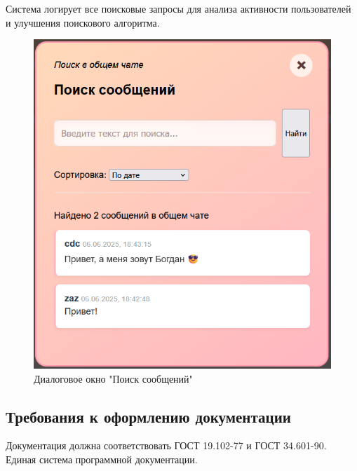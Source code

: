 Система логирует все поисковые запросы для анализа активности пользователей и улучшения поискового алгоритма.

\begin{figure}[h!]
	\centering
	\includegraphics[width=0.8\linewidth]{"images/Окно поиска по сообщениям"}
	\caption{Диалоговое окно "Поиск сообщений"}
	\label{fig:search}
\end{figure}

\subsection{Требования к оформлению документации}

Документация должна соответствовать ГОСТ 19.102-77 и ГОСТ 34.601-90. Единая система программной документации.